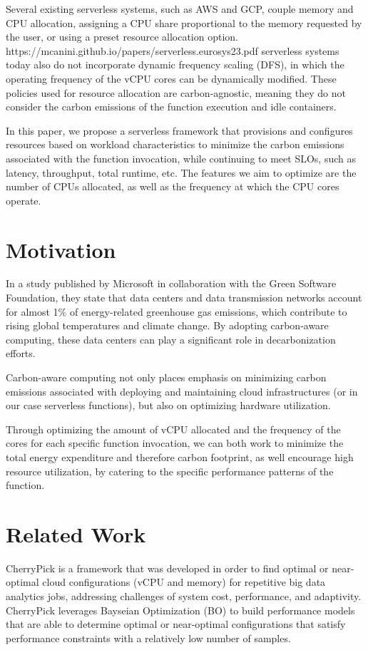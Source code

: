 \documentclass[times, 10pt,twocolumn]{article}
\begin{document}
Several existing serverless systems, such as AWS and GCP, couple memory and CPU allocation, assigning a CPU share proportional to the memory requested by the user, or using a preset resource allocation option. https://mcanini.github.io/papers/serverless.eurosys23.pdf serverless systems today also do not incorporate dynamic frequency scaling (DFS), in which the operating frequency of the vCPU cores can be dynamically modified. These policies used for resource allocation are carbon-agnostic, meaning they do not consider the carbon emissions of the function execution and idle containers.

In this paper, we propose a serverless framework that provisions and configures resources based on workload characteristics to minimize the carbon emissions associated with the function invocation, while continuing to meet SLOs, such as latency, throughput, total runtime, etc. The features we aim to optimize are the number of CPUs allocated, as well as the frequency at which the CPU cores operate. 
\section{Motivation}

In a study published by Microsoft in collaboration with the Green Software Foundation, they state that data centers and data transmission networks account for almost 1\% of energy-related greenhouse gas emissions, which contribute to rising global temperatures and climate change. By adopting carbon-aware computing, these data centers can play a significant role in decarbonization efforts. 

Carbon-aware computing not only places emphasis on minimizing carbon emissions associated with deploying and maintaining cloud infrastructures (or in our case serverless functions), but also on optimizing hardware utilization.       

Through optimizing the amount of vCPU allocated and the frequency of the cores for each specific function invocation, we can both work to minimize the total energy expenditure and therefore carbon footprint, as well encourage high resource utilization, by catering to the specific performance patterns of the function. 
\section{Related Work}
CherryPick\cite{CherryPick} is a framework that was developed in order to find optimal or near-optimal cloud configurations (vCPU and memory) for repetitive big data analytics jobs, addressing challenges of system cost, performance, and adaptivity. CherryPick leverages Bayseian Optimization (BO) to build performance models that are able to determine optimal or near-optimal configurations that satisfy performance constraints with a relatively low number of samples. 
\end{document}
